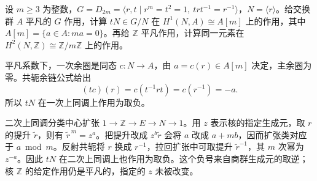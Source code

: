 \begin{exercise}\label{b4:ex:11-dihedral-conjugation-cohomology}
	设 \(m\ge3\) 为整数，\(G=D_{2m}=\langle r,t\mid r^m=t^2=1,\ trt^{-1}=r^{-1}\rangle\)，\(N=\langle r\rangle\)。给交换群 \(A\) 平凡的 \(G\) 作用，计算 \(tN\in G/N\) 在 \(H^1(N,A)\cong A[m]\) 上的作用，其中 \(A[m]=\{a\in A:ma=0\}\)。再给 \(\mathbb Z\) 平凡作用，计算同一元素在 \(H^2(N,\mathbb Z)\cong\mathbb Z/m\mathbb Z\) 上的作用。
\end{exercise}
\begin{solution}
	平凡系数下，一次余圈是同态 \(c:N\to A\)，由 \(a=c(r)\in A[m]\) 决定，主余圈为零。共轭余链公式给出
	\[
		(tc)(r)=c(t^{-1}rt)=c(r^{-1})=-a.
	\]
	所以 \(tN\) 在一次上同调上作用为取负。

	二次上同调分类中心扩张 \(1\to\mathbb Z\to E\to N\to1\)。用 \(z\) 表示核的指定生成元，取 \(r\) 的提升 \(\widetilde r\)，则有 \(\widetilde r^{\,m}=z^a\)。把提升改成 \(z^b\widetilde r\) 会将 \(a\) 改成 \(a+mb\)，因而扩张类对应于 \(a\bmod m\)。反射共轭将 \(r\) 换成 \(r^{-1}\)，拉回扩张中可取提升 \(\widetilde r^{-1}\)，其 \(m\) 次幂为 \(z^{-a}\)。因此 \(tN\) 在二次上同调上也作用为取负。这个负号来自商群生成元的取逆；核 \(\mathbb Z\) 的给定作用仍是平凡的，指定的 \(z\) 未被改变。
\end{solution}

